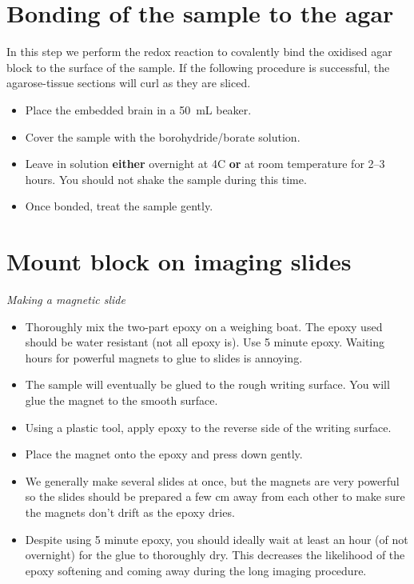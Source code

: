 \documentclass[paper=a4, fontsize=11pt]{scrartcl} %
\numberwithin{equation}{section} %
\numberwithin{figure}{section} %
\numberwithin{table}{section} %
\begin{document}
\section{Bonding of the sample to the agar}
In this step we perform the redox reaction to covalently bind the oxidised agar block to the surface of the sample. 
If the following procedure is successful, the agarose-tissue sections will curl as they are sliced.

\begin{itemize}
\item Place the embedded brain in a 50~mL beaker.
\item Cover the sample with the borohydride/borate solution.
\item Leave in solution \textbf{either} overnight at 4\degree C \textbf{or} at room temperature for 2--3 hours. 
You should not shake the sample during this time. 
\item Once bonded, treat the sample gently.
\end{itemize}


\section{Mount block on imaging slides}
\textit{Making a magnetic slide}

\begin{itemize}
\item Thoroughly mix the two-part epoxy on a weighing boat.
The epoxy used should be water resistant (not all epoxy is).
Use 5 minute epoxy. 
Waiting hours for powerful magnets to glue to slides is annoying.
\item The sample will eventually be glued to the rough writing surface.
You will glue the magnet to the smooth surface.  
\item Using a plastic tool, apply epoxy to the reverse side of the writing surface. 
\item Place the magnet onto the epoxy and press down gently. 
\item We generally make several slides at once, but the magnets are very powerful so the slides should be prepared a few cm away from each other to make sure the magnets don't drift as the epoxy dries. 
\item Despite using 5 minute epoxy, you should ideally wait at least an hour (of not overnight) for the glue to thoroughly dry. 
This decreases the likelihood of the epoxy softening and coming away during the long imaging procedure.
\end{itemize}
\end{document}
